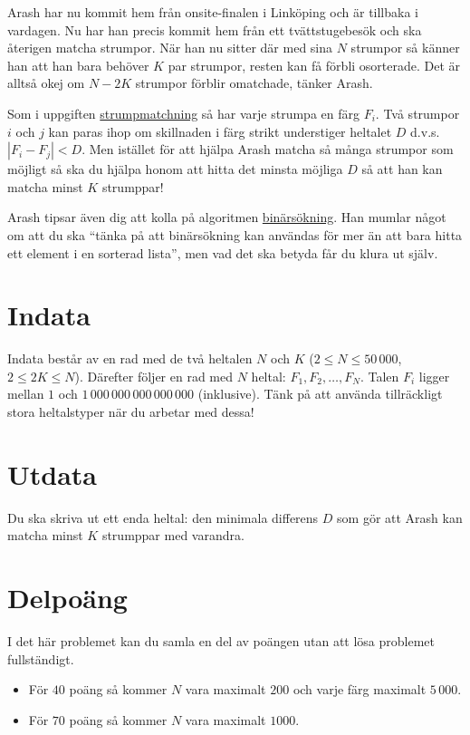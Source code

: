 
Arash har nu kommit hem från onsite-finalen i Linköping och är tillbaka i
vardagen. Nu har han precis kommit hem från ett tvättstugebesök och ska
återigen matcha strumpor. När han nu sitter där med sina $N$ strumpor
så känner han att han bara behöver $K$ par strumpor, resten kan få förbli
osorterade. Det är alltså okej om $N-2K$ strumpor förblir omatchade, tänker Arash.

Som i uppgiften \href{https://po.scrool.se/problems/strumpor}{strumpmatchning}
så har varje strumpa en färg $F_i$. Två strumpor $i$ och $j$ kan paras ihop om
skillnaden i färg strikt understiger heltalet $D$ d.v.s. $|F_{i} - F_{j}|<D$.
Men istället för att hjälpa Arash matcha så många strumpor som möjligt så ska
du hjälpa honom att hitta det minsta möjliga $D$
så att han kan matcha minst $K$ strumppar!

Arash tipsar även dig att kolla på algoritmen
\href{http://www.progolymp.se/Oldpage/ioitraning/dictionary.htm}{binärsökning}.
Han mumlar något om att du ska ``tänka på att binärsökning kan användas för mer än
att bara hitta ett element i en sorterad lista'', men vad det ska betyda får du
klura ut själv.

\section*{Indata}

Indata består av en rad med de två heltalen $N$ och $K$ ($2 \le N
\le 50\,000$, $2 \le 2K \le N$). Därefter följer en rad med $N$
heltal: $F_1, F_2, \dots, F_N$. Talen $F_i$ ligger mellan $1$
och $1\,000\,000\,000\,000\,000$ (inklusive). Tänk på att använda
tillräckligt stora heltalstyper när du arbetar med dessa!

\section*{Utdata}

Du ska skriva ut ett enda heltal: den minimala differens $D$ som gör att Arash kan
matcha minst $K$ strumppar med varandra.

\section*{Delpoäng}

I det här problemet kan du samla en del av poängen utan att lösa
problemet fullständigt.

\begin{itemize}
    \item För $40$ poäng så kommer $N$ vara maximalt $200$ och varje färg maximalt $5\,000$.
    \item För $70$ poäng så kommer $N$ vara maximalt $1000$.
\end{itemize}
